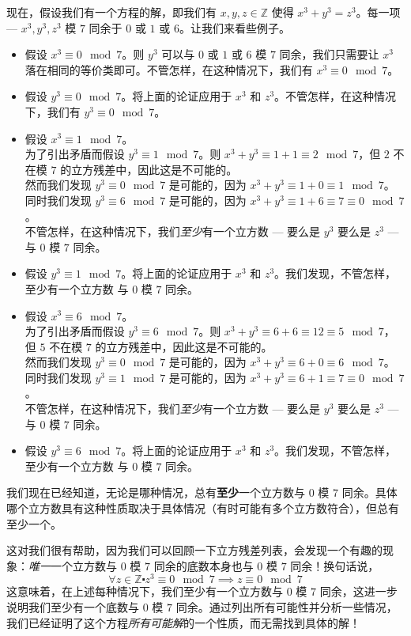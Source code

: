 \begin{example}
    现在，假设我们有一个方程的解，即我们有 $x, y, z \in \mathbb{Z}$ 使得 $x^3 + y^3 = z^3$。每一项 --- $x^3,y^3,z^3$ 模 $7$ 同余于 $0$ 或 $1$ 或 $6$。让我们来看些例子。
    \begin{itemize}
        \item 假设 $x^3 \equiv 0 \mod 7$。则 $y^3$ 可以与 $0$ 或 $1$ 或 $6$ 模 $7$ 同余，我们只需要让 $x^3$ 落在相同的等价类即可。不管怎样，在这种情况下，我们有 $x^3 \equiv 0 \mod 7$。
        \item 假设 $y^3 \equiv 0 \mod 7$。将上面的论证应用于 $x^3$ 和 $z^3$。不管怎样，在这种情况下，我们有 $y^3 \equiv 0 \mod 7$。
        \item 假设 $x^3 \equiv 1 \mod 7$。\\
            为了引出矛盾而假设 $y^3 \equiv 1 \mod 7$。则 $x^3+y^3 \equiv 1+1 \equiv 2 \mod 7$，但 $2$ 不在模 $7$ 的立方残差中，因此这是不可能的。\\
            然而我们发现 $y^3 \equiv 0 \mod 7$ 是可能的，因为 $x^3+y^3 \equiv 1+0 \equiv 1 \mod 7$。\\
            同时我们发现 $y^3 \equiv 6 \mod 7$ 是可能的，因为 $x^3+y^3 \equiv 1+6 \equiv 7 \equiv 0 \mod 7$。\\
            不管怎样，在这种情况下，我们\emph{至少}有一个立方数 --- 要么是 $y^3$ 要么是 $z^3$ --- 与 $0$ 模 $7$ 同余。
        \item 假设 $y^3 \equiv 1 \mod 7$。将上面的论证应用于 $x^3$ 和 $z^3$。我们发现，不管怎样，至少有一个立方数 与 $0$ 模 $7$ 同余。
        \item 假设 $x^3 \equiv 6 \mod 7$。\\
            为了引出矛盾而假设 $y^3 \equiv 6 \mod 7$。则 $x^3+y^3 \equiv 6+6 \equiv 12 \equiv 5 \mod 7$，但 $5$ 不在模 $7$ 的立方残差中，因此这是不可能的。\\
            然而我们发现 $y^3 \equiv 0 \mod 7$ 是可能的，因为 $x^3+y^3 \equiv 6+0 \equiv 6 \mod 7$。\\
            同时我们发现 $y^3 \equiv 1 \mod 7$ 是可能的，因为 $x^3+y^3 \equiv 6+1 \equiv 7 \equiv 0 \mod 7$。\\
            不管怎样，在这种情况下，我们\emph{至少}有一个立方数 --- 要么是 $y^3$ 要么是 $z^3$ --- 与 $0$ 模 $7$ 同余。
        \item 假设 $y^3 \equiv 6 \mod 7$。将上面的论证应用于 $x^3$ 和 $z^3$。我们发现，不管怎样，至少有一个立方数 与 $0$ 模 $7$ 同余。
    \end{itemize}

    我们现在已经知道，无论是哪种情况，总有\textbf{至少}一个立方数与 $0$ 模 $7$ 同余。具体哪个立方数具有这种性质取决于具体情况（有时可能有多个立方数符合），但总有至少一个。

    这对我们很有帮助，因为我们可以回顾一下立方残差列表，会发现一个有趣的现象：\emph{唯一}一个立方数与 $0$ 模 $7$ 同余的底数本身也与 $0$ 模 $7$ 同余！换句话说，
    \[\forall z \in \mathbb{Z} \centerdot z^3 \equiv 0 \mod 7 \implies z \equiv 0 \mod 7\]
    这意味着，在上述每种情况下，我们至少有一个立方数与 $0$ 模 $7$ 同余，这进一步说明我们至少有一个底数与 $0$ 模 $7$ 同余。通过列出所有可能性并分析一些情况，我们已经证明了这个方程\emph{所有可能解}的一个性质，而无需找到具体的解！
\end{example}

